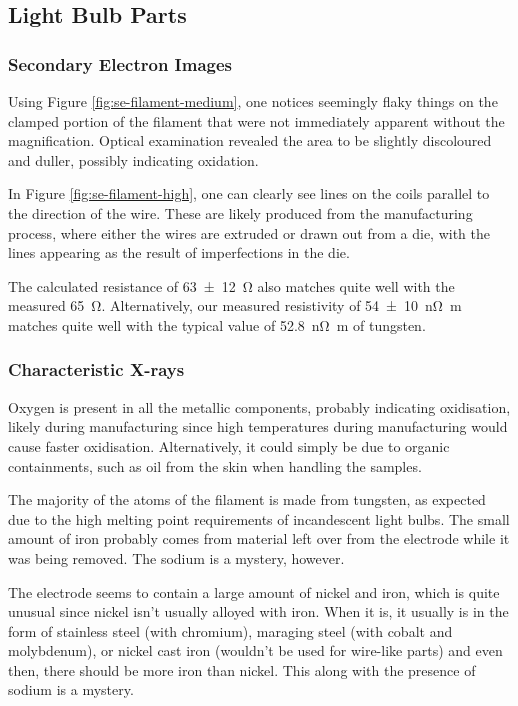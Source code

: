 \documentclass[a4paper]{scrartcl}
\begin{document}
\subsection{Light Bulb Parts}
\subsubsection{Secondary Electron Images}
Using Figure \ref{fig:se-filament-medium}, one notices seemingly flaky things on the clamped portion of the filament that were not immediately apparent without the magnification. Optical examination revealed the area to be slightly discoloured and duller, possibly indicating oxidation.

In Figure \ref{fig:se-filament-high}, one can clearly see lines on the coils parallel to the direction of the wire. These are likely produced from the manufacturing process, where either the wires are extruded or drawn out from a die, with the lines appearing as the result of imperfections in the die.

The calculated resistance of \SI{63 \pm 12}{\ohm} also matches quite well with the measured \SI{65}{\ohm}. Alternatively, our measured resistivity of \SI{54 \pm 10}{\nano\ohm\metre} matches quite well with the typical value of \SI{52.8}{\nano\ohm\metre} of tungsten.

\subsubsection{Characteristic X-rays}
Oxygen is present in all the metallic components, probably indicating oxidisation, likely during manufacturing since high temperatures during manufacturing would cause faster oxidisation. Alternatively, it could simply be due to organic containments, such as oil from the skin when handling the samples.

The majority of the atoms of the filament is made from tungsten, as expected due to the high melting point requirements of incandescent light bulbs. The small amount of iron probably comes from material left over from the electrode while it was being removed. The sodium is a mystery, however.

The electrode seems to contain a large amount of nickel and iron, which is quite unusual since nickel isn't usually alloyed with iron. When it is, it usually is in the form of stainless steel (with chromium), maraging steel (with cobalt and molybdenum), or nickel cast iron (wouldn't be used for wire-like parts) and even then, there should be more iron than nickel. This along with the presence of sodium is a mystery.
\end{document}
